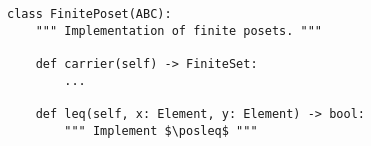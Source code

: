 \begin{verbatim}
class FinitePoset(ABC):
    """ Implementation of finite posets. """

    def carrier(self) -> FiniteSet:
        ...

    def leq(self, x: Element, y: Element) -> bool:
        """ Implement $\posleq$ """
\end{verbatim}